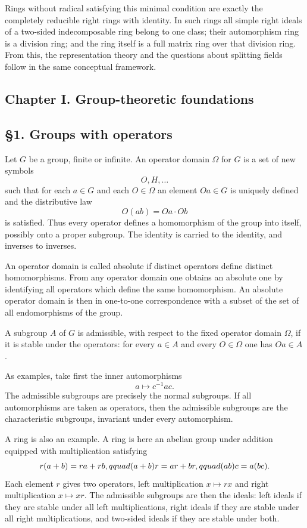 \documentclass[11pt]{article}
\begin{document}
Rings without radical satisfying this minimal condition are exactly the
completely reducible right rings with identity. In such rings all simple
right ideals of a two-sided indecomposable ring belong to one class;
their automorphism ring is a division ring; and the ring itself is a
full matrix ring over that division ring. From this, the representation
theory and the questions about splitting fields follow in the same
conceptual framework.

\subsection{Chapter I. Group-theoretic
foundations}\label{chapter-i.-group-theoretic-foundations}

\subsection{§1. Groups with operators}\label{groups-with-operators}

Let \(G\) be a group, finite or infinite. An operator domain \(\Omega\)
for \(G\) is a set of new symbols \[
  O,H,\ldots
\] such that for each \(a\in G\) and each \(O\in\Omega\) an element
\(Oa\in G\) is uniquely defined and the distributive law \[
  O(ab)=Oa\cdot Ob
\] is satisfied. Thus every operator defines a homomorphism of the group
into itself, possibly onto a proper subgroup. The identity is carried to
the identity, and inverses to inverses.

An operator domain is called absolute if distinct operators define
distinct homomorphisms. From any operator domain one obtains an absolute
one by identifying all operators which define the same homomorphism. An
absolute operator domain is then in one-to-one correspondence with a
subset of the set of all endomorphisms of the group.

A subgroup \(A\) of \(G\) is admissible, with respect to the fixed
operator domain \(\Omega\), if it is stable under the operators: for
every \(a\in A\) and every \(O\in\Omega\) one has \(Oa\in A\).

As examples, take first the inner automorphisms \[
  a\mapsto c^{-1}ac.
\] The admissible subgroups are precisely the normal subgroups. If all
automorphisms are taken as operators, then the admissible subgroups are
the characteristic subgroups, invariant under every automorphism.

A ring is also an example. A ring is here an abelian group under
addition equipped with multiplication satisfying \[
  r(a+b)=ra+rb,
  \\qquad
  (a+b)r=ar+br,
  \\qquad
  (ab)c=a(bc).
\] Each element \(r\) gives two operators, left multiplication
\(x\mapsto rx\) and right multiplication \(x\mapsto xr\). The admissible
subgroups are then the ideals: left ideals if they are stable under all
left multiplications, right ideals if they are stable under all right
multiplications, and two-sided ideals if they are stable under both.
\end{document}
